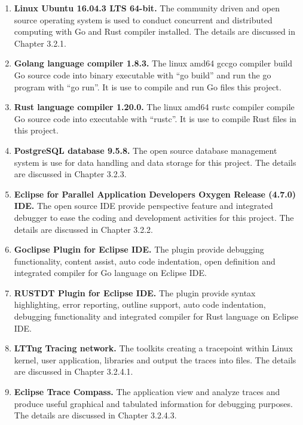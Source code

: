 \begin{enumerate}[topsep=0pt,itemsep=-1ex,partopsep=1ex,parsep=1.5ex]

\item \textbf{Linux Ubuntu 16.04.3 LTS 64-bit.} The community driven and open source operating system is used to conduct concurrent and distributed computing with Go and Rust compiler installed. The details are discussed in Chapter 3.2.1. 

\item \textbf{Golang language compiler 1.8.3.} The linux amd64 gccgo compiler build Go source code into binary executable with “go build” and run the go program with “go run”. It is use to compile and run Go files this project.

\item \textbf{Rust language compiler 1.20.0. } The linux amd64 rustc compiler compile Go source code into executable with “rustc”.  It is use to compile Rust files in this project.

\item \textbf{PostgreSQL database 9.5.8.} The open source database management system is use for data handling and data storage for this project. The details are discussed in Chapter 3.2.3.

\item \textbf{Eclipse for Parallel Application Developers Oxygen Release (4.7.0) IDE.} The open source IDE provide perspective feature and integrated debugger to ease the coding and development activities for this project. The details are discussed in Chapter 3.2.2.

\item \textbf{Goclipse Plugin for Eclipse IDE.} The plugin provide debugging functionality, content assist, auto code indentation, open definition and integrated compiler for Go language on Eclipse IDE. 

\item \textbf{RUSTDT Plugin for Eclipse IDE.} The plugin provide syntax highlighting, error reporting, outline support, auto code indentation, debugging functionality and integrated compiler for Rust language on Eclipse IDE. 

\item \textbf{LTTng Tracing network. } The toolkits creating a tracepoint within Linux kernel, user application, libraries and output the traces into files. The details are discussed in Chapter 3.2.4.1.


\item \textbf{Eclipse Trace Compass.} The application view and analyze traces and produce useful graphical and tabulated information for debugging purposes. The details are discussed in Chapter 3.2.4.3.


\end{enumerate}
